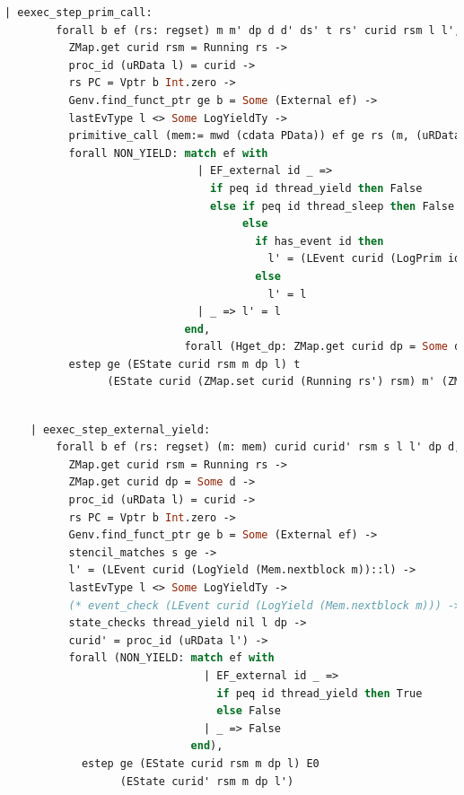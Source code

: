 \begin{lstlisting}[language=Caml]
    | eexec_step_prim_call:
        forall b ef (rs: regset) m m' dp d d' ds' t rs' curid rsm l l',
          ZMap.get curid rsm = Running rs ->
          proc_id (uRData l) = curid ->
          rs PC = Vptr b Int.zero ->
          Genv.find_funct_ptr ge b = Some (External ef) ->
          lastEvType l <> Some LogYieldTy ->
          primitive_call (mem:= mwd (cdata PData)) ef ge rs (m, (uRData l, d)) t rs' (m', (ds', d')) ->
          forall NON_YIELD: match ef with
                              | EF_external id _ => 
                                if peq id thread_yield then False
                                else if peq id thread_sleep then False
                                     else
                                       if has_event id then
                                         l' = (LEvent curid (LogPrim id nil 0 (snap_func d)) :: l)
                                       else
                                         l' = l
                              | _ => l' = l
                            end,
                            forall (Hget_dp: ZMap.get curid dp = Some d),
          estep ge (EState curid rsm m dp l) t 
                (EState curid (ZMap.set curid (Running rs') rsm) m' (ZMap.set curid (Some d') dp) l')
\end{lstlisting}

\begin{lstlisting}[language=Caml]

    | eexec_step_external_yield:
        forall b ef (rs: regset) (m: mem) curid curid' rsm s l l' dp d,
          ZMap.get curid rsm = Running rs ->
          ZMap.get curid dp = Some d ->
          proc_id (uRData l) = curid ->
          rs PC = Vptr b Int.zero ->
          Genv.find_funct_ptr ge b = Some (External ef) ->
          stencil_matches s ge ->
          l' = (LEvent curid (LogYield (Mem.nextblock m))::l) ->
          lastEvType l <> Some LogYieldTy ->
          (* event_check (LEvent curid (LogYield (Mem.nextblock m))) -> *)
          state_checks thread_yield nil l dp ->
          curid' = proc_id (uRData l') ->
          forall (NON_YIELD: match ef with
                               | EF_external id _ => 
                                 if peq id thread_yield then True
                                 else False
                               | _ => False
                             end),
            estep ge (EState curid rsm m dp l) E0
                  (EState curid' rsm m dp l')
\end{lstlisting}

